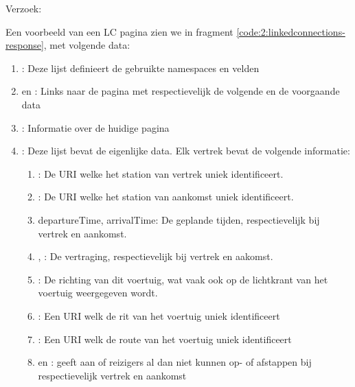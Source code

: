Verzoek: 

Een voorbeeld van een LC pagina zien we in fragment \ref{code:2:linkedconnections-response}, met volgende data:
\begin{enumerate}
	\item {}: Deze lijst definieert de gebruikte namespaces en velden
	\item {} en  : Links naar de pagina met respectievelijk de volgende en de voorgaande data
	\item {}: Informatie over de huidige pagina
	\item {}: Deze lijst bevat de eigenlijke data. Elk vertrek bevat de volgende informatie:
	\begin{enumerate}
			\item {}: De URI welke het station van vertrek uniek identificeert.
			\item {}: De URI welke het station van aankomst uniek identificeert.	\item departureTime, arrivalTime: De geplande tijden, respectievelijk bij vertrek en aankomst.
			\item {}, : De vertraging, respectievelijk bij vertrek en aakomst.
			\item {}: De richting van dit voertuig, wat vaak ook op de lichtkrant van het voertuig weergegeven wordt.
			\item {}: Een URI welk de rit van het voertuig uniek identificeert
			\item {}: Een URI welk de route van het voertuig uniek identificeert
			\item {} en : geeft aan of reizigers al dan niet kunnen op- of afstappen bij respectievelijk vertrek en aankomst
	\end{enumerate}
\end{enumerate}

